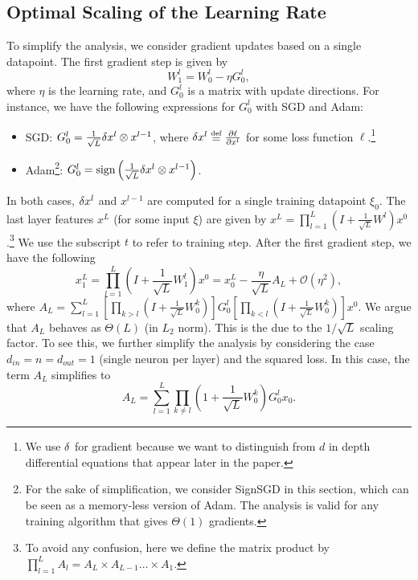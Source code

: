 \documentclass{article}
\theoremstyle{plain}
\theoremstyle{definition}
\begin{document}
\subsection{Optimal Scaling of the Learning Rate}
To simplify the analysis, we consider gradient updates based on a single datapoint. The first gradient step is given by 
$$
W^l_1 = W^l_0 - \eta G^l_0, 
$$
where $\eta$ is the learning rate, and $G^l_0$ is a matrix with update directions. For instance, we have the following expressions for $G^l_0$ with SGD and Adam:
\begin{itemize}
    \item SGD: $G^l_0 = \frac{1}{\sqrt{L}} \delta x^{l} \otimes x^{l-1}$, where $\del x^l \defeq \frac{\partial \ell}{\partial x^l}$ for some loss function $\ell$.\footnote{We use $\delta$ for gradient because we want to distinguish from $d$ in depth differential equations that appear later in the paper. }
    \item Adam\footnote{For the sake of simplification, we consider SignSGD in this section, which can be seen as a memory-less version of Adam. The analysis is valid for any training algorithm that gives $\Theta(1)$ gradients.}:  $G^l_0 = \textrm{sign}\left(\frac{1}{\sqrt{L}} \delta x^{l} \otimes x^{l-1}\right)$.
\end{itemize}
In both cases, $\delta x^{l}$ and $x^{l-1}$ are computed for a single training datapoint $\xi_0$.
The last layer features $x^L$ (for some input $\xi$) are given by $x^L = \prod_{l=1}^L \left( I + \frac{1}{\sqrt{L}} W^l\right) x^0$.\footnote{ To avoid any confusion, here we define the matrix product by $\prod_{l=1}^L A_l = A_L \times A_{L-1} \dots \times A_1$.} We use the subscript $t$ to refer to training step. After the first gradient step, we have the following 
\begin{equation}\label{eq:first_order_linear}
x^L_1 = \prod_{l=1}^L \left( I + \frac{1}{\sqrt{L}} W^l_1\right) x^0 = x^L_0 - \frac{\eta}{\sqrt{L}} A_L + \mathcal{O}(\eta^2),
\end{equation}
where $A_L = \sum_{l=1}^L \left[\prod_{k>l} \left( I + \frac{1}{\sqrt{L}} W^k_0\right)\right] G^l_0 \left[\prod_{k<l} \left( I + \frac{1}{\sqrt{L}} W^k_0\right)\right] x^0$. 
We argue that $A_L$ behaves as $\Theta(L)$ (in $L_2$ norm). This is the due to the $1/\sqrt{L}$ scaling factor. To see this, we further simplify the analysis by considering the case $d_{in} = n = d_{out} = 1$ (single neuron per layer) and the squared loss. In this case, the term $A_L$ simplifies to 
$$
A_L = \sum_{l=1}^L \prod_{k \neq l}\left(1 + \frac{1}{\sqrt{L}} W^k_0\right) G^l_0 x_0.
$$
\end{document}
